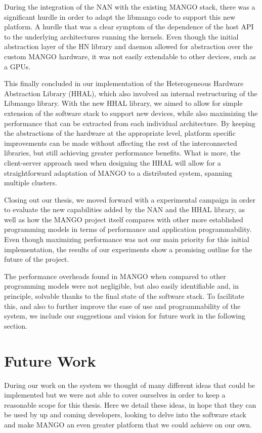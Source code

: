 During the integration of the NAN with the existing MANGO stack, there was a significant hurdle in order to adapt the libmango code to support this new platform. A hurdle that was a clear symptom of the dependence of the host API to the underlying architectures running the kernels. Even though the initial abstraction layer of the HN library and daemon allowed for abstraction over the custom MANGO hardware, it was not easily extendable to other devices, such as a GPUs.

This finally concluded in our implementation of the Heterogeneous Hardware Abstraction Library (HHAL), which also involved an internal restructuring of the Libmango library. With the new HHAL library, we aimed to allow for simple extension of the software stack to support new devices, while also maximizing the performance that can be extracted from each individual architecture. By keeping the abstractions of the hardware at the appropriate level, platform specific improvements can be made without affecting the rest of the interconnected libraries, but still achieving greater performance benefits. What is more, the client-server approach used when designing the HHAL will allow for a straightforward adaptation of MANGO to a distributed system, spanning multiple clusters.

Closing out our thesis, we moved forward with a experimental campaign in order to evaluate the new capabilities added by the NAN and the HHAL library, as well as how the MANGO project itself compares with other more established programming models in terms of performance and application programmability. Even though maximizing performance was not our main priority for this initial implementation, the results of our experiments show a promising outline for the future of the project. 

The performance overheads found in MANGO when compared to other programming models were not negligible, but also easily identifiable and, in principle, solvable thanks to the final state of the software stack. To facilitate this, and also to further improve the ease of use and programmability of the system, we include our suggestions and vision for future work in the following section.

\section{Future Work} \label{sect:future-work}

During our work on the system we thought of many different ideas that could be implemented but we were not able to cover ourselves in order to keep a reasonable scope for this thesis. Here we detail these ideas, in hope that they can be used by up and coming developers, looking to delve into the software stack and make MANGO an even greater platform that we could achieve on our own.

